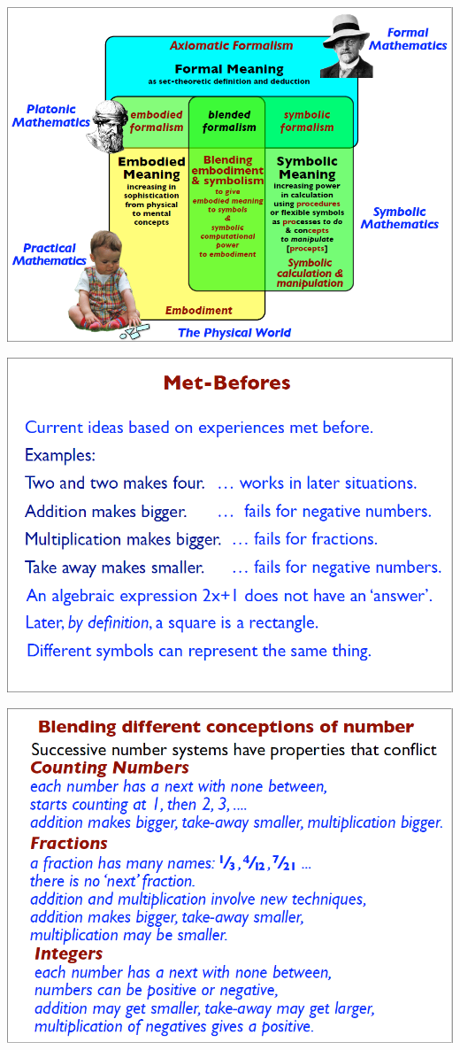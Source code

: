 \documentclass{article}
\begin{document}
\begin{minipage}[t]{0.32\linewidth}
	\includegraphics[width=1\textwidth]{david_tall/dt10.png}%
	
	\includegraphics[width=1\textwidth]{david_tall/dt13.png}%
	
	\includegraphics[width=1\textwidth]{david_tall/dt16.png}%
\end{minipage} 
\end{document}

